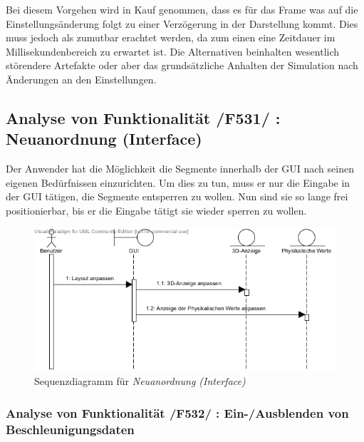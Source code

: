 Bei diesem Vorgehen wird in Kauf genommen, dass es für das Frame was auf die Einstellungsänderung folgt zu einer Verzögerung in der Darstellung kommt. Dies muss jedoch als zumutbar erachtet werden, da zum einen
eine Zeitdauer im Millisekundenbereich zu erwartet ist. Die Alternativen beinhalten wesentlich störendere Artefakte oder aber das grundsätzliche Anhalten der Simulation nach Änderungen an den Einstellungen.

\subsection{Analyse von Funktionalität /F531/ :   Neuanordnung (Interface)}
Der Anwender hat die Möglichkeit die Segmente innerhalb der GUI nach seinen eigenen Bedürfnissen einzurichten. Um dies zu tun, muss er nur die Eingabe in der GUI tätigen, die Segmente entsperren zu wollen.
Nun sind sie so lange frei positionierbar, bis er die Eingabe tätigt sie wieder sperren zu wollen.
\begin{figure}
\includegraphics[width=16cm]{bilder/Interface_Neuanordnung}
\caption{Sequenzdiagramm für \textit{Neuanordnung (Interface)}}
\label{labelname}
\end{figure}
\subsubsection{Analyse von Funktionalität /F532/ :  Ein-/Ausblenden von Beschleunigungsdaten}
